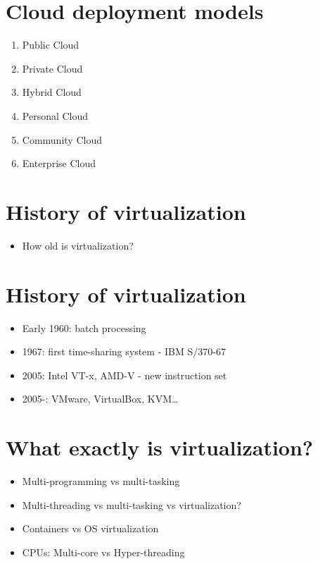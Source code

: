 \documentclass[11pt]{article}
\begin{document}
\section*{Cloud deployment models}
\label{sec:orgda66f46}
\begin{enumerate}
\item Public Cloud
\item Private Cloud
\item Hybrid Cloud
\item Personal Cloud
\item Community Cloud
\item Enterprise Cloud
\end{enumerate}

\section*{History of virtualization}
\label{sec:orgf92238a}
\begin{itemize}
\item How old is virtualization?
\end{itemize}

\section*{History of virtualization}
\label{sec:org8ad1d5e}
\begin{itemize}
\item Early 1960: batch processing
\item 1967: first time-sharing system - IBM S/370-67
\item 2005: Intel VT-x, AMD-V - new instruction set
\item 2005-: VMware, VirtualBox, KVM\ldots{}
\end{itemize}

\section*{What exactly is virtualization?}
\label{sec:org8cf695f}
\begin{itemize}
\item Multi-programming vs multi-tasking
\item Multi-threading vs multi-tasking vs virtualization?
\item Containers vs OS virtualization
\item CPUs: Multi-core vs Hyper-threading
\end{itemize}
\end{document}
